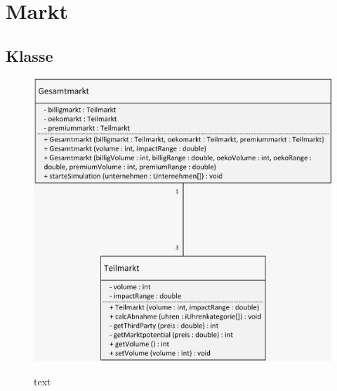 \clearpage
\chapter{Markt} \label{KapitelMarkt}
\section{Klasse}
\begin{figure} [!h]
	\centering
	\includegraphics[scale=0.3]{img/Markt.png} 
	\label{key}
	\caption{text}
\end{figure}
\clearpage
